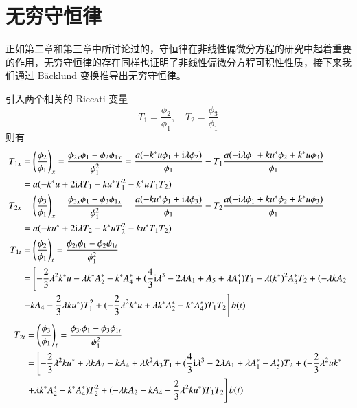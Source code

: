 \section{无穷守恒律}
正如第二章和第三章中所讨论过的，守恒律在非线性偏微分方程的研究中起着重要的作用，无穷守恒律的存在同样也证明了非线性偏微分方程可积性性质，接下来我们通过 B\"{a}cklund 变换推导出无穷守恒律。

引入两个相关的 Riccati 变量
\begin{equation}
  T_{1} = \frac{\phi_{2}}{\phi_{1}}, \quad T_{2} = \frac{\phi_{3}}{\phi_{1}}
\end{equation}
则有
\begin{align}
  T_{1x} &= \left(\frac{\phi_2}{\phi_1}\right)_x=\frac{\phi_{2x}\phi_1-\phi_2\phi_{1x}}{\phi_1^2}=\frac{a(-k^*u\phi_1+\mathrm{i}\lambda\phi_2)}{\phi_1}-T_1\frac{a(-\mathrm{i}\lambda\phi_1+ku^*\phi_2+k^*u\phi_3)}{\phi_1}\nonumber\\
  &= a(-k^{*}u + 2\mathrm{i}\lambda T_{1} - ku^{*}T_{1}^{2} - k^{*}uT_{1}T_{2}) \label{nss-t1x} \\
  T_{2x} &=\left(\frac{\phi_3}{\phi_1}\right)_x=\frac{\phi_{3x}\phi_1-\phi_3\phi_{1x}}{\phi_1^2}=\frac{a(-ku^*\phi_1+\mathrm{i}\lambda\phi_3)}{\phi_1}-T_2\frac{a(-\mathrm{i}\lambda\phi_1+ku^*\phi_2+k^*u\phi_3)}{\phi_1}\nonumber\\
  &= a(-ku^{*} + 2\mathrm{i}\lambda T_{2} - k^{*}uT_{2}^{2} - ku^{*}T_{1}T_{2}) \label{nss-t2x} \\
  T_{1t}  &=\left(\frac{\phi_2}{\phi_1}\right)_t=\frac{\phi_{2t}\phi_1-\phi_2\phi_{1t}}{\phi_1^2}\nonumber\\
  &= \left[-\frac{2}{3}\lambda^{2}k^{*}u - \lambda k^{*}A_{2}^{*} - k^{*}A_{4}^{*} + (\frac{4}{3}\mathrm{i}\lambda^{3}-2\lambda A_{1}+A_{5}+\lambda A_{1}^{*})T_{1} - \lambda (k^{*})^{2}A_{3}^{*}T_{2} + (-\lambda kA_{2} \right.\notag\\
  & \left. - kA_{4} - \frac{2}{3}\lambda ku^{*})T_{1}^{2} + (-\frac{2}{3}\lambda^{2}k^{*}u+\lambda k^{*}A_{2}^{*}-k^{*}A_{4}^{*})T_{1}T_{2} \right]b(t) 
\end{align}
\begin{align}
  T_{2t} &=\left(\frac{\phi_3}{\phi_1}\right)_t=\frac{\phi_{3t}\phi_1-\phi_3\phi_{1t}}{\phi_1^2}\nonumber\\
  &= \left[-\frac{2}{3}\lambda^{2}ku^{*} + \lambda kA_{2} - kA_{4} + \lambda k^{2}A_{3}T_{1} + (\frac{4}{3}\mathrm{i}\lambda^{3}-2\lambda A_{1}+\lambda A_{1}^{*}-A_{5}^{*})T_{2} + (-\frac{2}{3}\lambda^{2}uk^{*} \right. \notag\\
  & \left. +\lambda k^{*}A_{2}^{*}-k^{*}A_{4}^{*})T_{2}^{2} + (-\lambda kA_{2}-kA_{4}-\frac{2}{3}\lambda^{2}ku^{*})T_{1}T_{2} \right]b(t)
\end{align}
